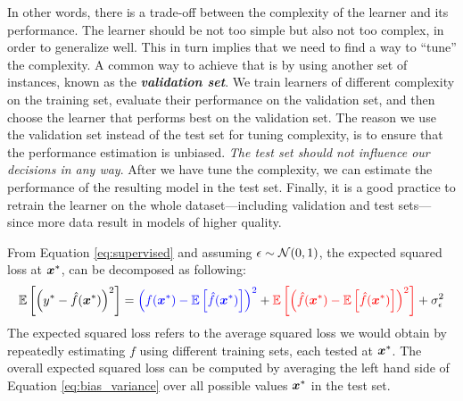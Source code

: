 In other words, there is a trade-off between the complexity of the learner and
its performance. The learner should be not too simple but also not too complex,
in order to generalize well. This in turn implies that we need to find a way to
``tune'' the complexity. A common way to achieve that is by using another set of
instances, known as the \emph{\textbf{validation set}}. We
train learners of different complexity on the training set,
evaluate their performance on the validation set, and then choose the learner
that performs best on the validation set. The reason we use the validation set
instead of the test set for tuning complexity, is to ensure that the performance
estimation is unbiased. \emph{The test set should not influence
our decisions in any way}. After we have tune the complexity, we can estimate
the performance of the resulting model in the test set. Finally, it is a good
practice to retrain the learner on the whole dataset---including validation and
test sets---since more data result in models of higher quality.

\begin{theorem}
	\label{thrm:bias_variance}
	From Equation \ref{eq:supervised} and assuming $\epsilon \sim \mathcal{N}(0, 1)$,
	the expected squared loss at
	$\boldsymbol{x}^*$, can be decomposed as following:
	\begin{equation}
		\label{eq:bias_variance}
		\mathbb{E}\left[\left(y^* - \hat{f}(\boldsymbol{x}^*)\right)^2\right]
		=
		\color{blue}\left(f(\boldsymbol{x}^*) - \mathbb{E}\left[\hat{f}(\boldsymbol{x}^*)\right]\right)^2
		\color{black}
		+
		\color{red}\mathbb{E}\left[\left(\hat{f}(\boldsymbol{x}^*) - \mathbb{E}\left[\hat{f}(\boldsymbol{x}^*)\right]\right)^2\right]
		\color{black}
		+
		\sigma_{\epsilon}^{2}
	\end{equation}
	The expected squared loss refers to the average squared loss we would obtain
	by repeatedly estimating $f$ using different training sets, each tested at
	$\boldsymbol{x}^*$. The overall expected squared loss can be computed by averaging the
	left hand side of Equation \ref{eq:bias_variance} over all possible values
	$\boldsymbol{x}^*$ in the test set.
\end{theorem}


